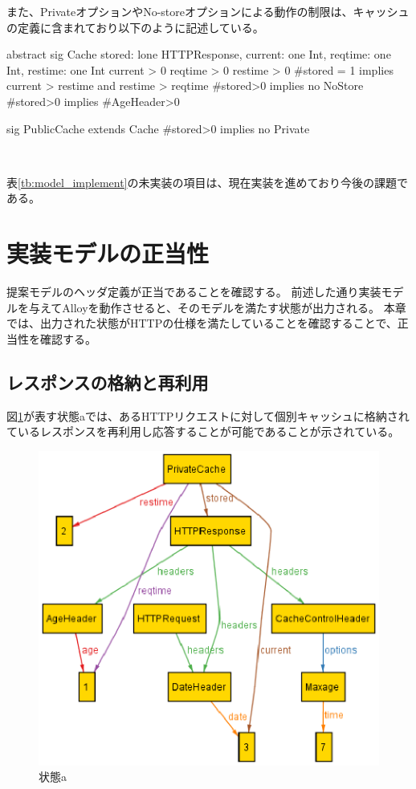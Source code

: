 \documentclass{css}
\begin{document}
\color{red}
また、PrivateオプションやNo-storeオプションによる動作の制限は、キャッシュの定義に含まれており以下のように記述している。\\\hrulefill
\begin{small}
\begin{verbatimtab}[4]
abstract sig Cache{
	stored: lone HTTPResponse,
	current: one Int,
	reqtime: one Int,
	restime: one Int
}{
	current > 0
	reqtime > 0
	restime > 0
	#stored  = 1 implies
		current > restime and restime > reqtime
	#stored>0 implies no NoStore
	#stored>0 implies #AgeHeader>0
}

sig PublicCache extends Cache{}{
	#stored>0 implies no Private
}
\end{verbatimtab}
\end{small}
\hrulefill\\
\color{black}

表\ref{tb:model_implement}の未実装の項目は、現在実装を進めており今後の課題である。

\section{実装モデルの正当性}
\label{sec:correctness}
提案モデルのヘッダ定義が正当であることを確認する。
前述した通り実装モデルを与えてAlloyを動作させると、そのモデルを満たす状態が出力される。
本章では、出力された状態がHTTPの仕様を満たしていることを確認することで、正当性を確認する。

\subsection{レスポンスの格納と再利用}
図\ref{fig:case1}が表す状態aでは、あるHTTPリクエストに対して個別キャッシュに格納されているレスポンスを再利用し応答することが可能であることが示されている。

\begin{figure}[htb]
\centering
\includegraphics[width=1.0\hsize]{case1.eps}
\caption{状態a}
\label{fig:case1}
\end{figure}
\end{document}
